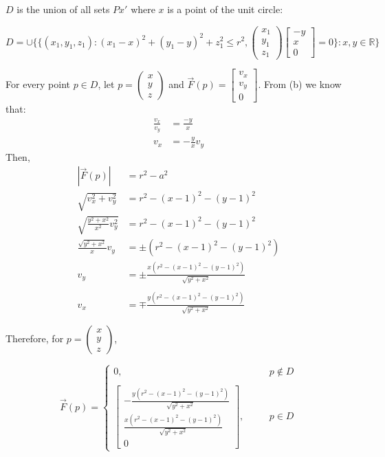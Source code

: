 \begin{exercise}{8}
\begin{enumerate}
    $D$ is the union of all sets $Px'$ where $x$ is a point of the unit circle:
    
    $$D = \cup\{\{(x_1, y_1, z_1): (x_1 - x)^2 + (y_1 - y)^2 + z_1^2 \leq r^2,
                                   \begin{pmatrix}x_1\\y_1\\z_1\end{pmatrix}
                                   \begin{bmatrix}-y\\x\\0\end{bmatrix} = 0
                \} : x, y \in \mathbb{R}\}$$
    
    For every point $p \in D$, let $p = \begin{pmatrix}x\\y\\z\end{pmatrix}$ and
    $\vec{F}(p) = \begin{bmatrix}v_x\\v_y\\0\end{bmatrix}$. From (b)
    we know that:
    \begin{align*}
      \frac{v_x}{v_y} &= \frac{-y}{x} \\
                  v_x &= -\frac{y}{x}v_y 
    \end{align*}
    Then,
    \begin{align*}
                         |\vec{F}(p)| &= r^2 - a^2 \\
                 \sqrt{v_x^2 + v_y^2} &= r^2 - (x-1)^2 - (y-1)^2 \\
      \sqrt{\frac{y^2+x^2}{x^2}v_y^2} &= r^2 - (x-1)^2 - (y-1)^2 \\
        \frac{\sqrt{y^2 + x^2}}{x}v_y &= \pm (r^2 - (x-1)^2 - (y-1)^2) \\
      v_y &= \pm \frac{x(r^2 - (x-1)^2 - (y-1)^2)}{\sqrt{y^2 + x^2}} \\ & \\
      v_x &= \mp \frac{y(r^2 - (x-1)^2 - (y-1)^2)}{\sqrt{y^2 + x^2}}
    \end{align*}
    
    Therefore, for $p = \begin{pmatrix}x\\y\\z\end{pmatrix}$,
    
    $$\vec{F}(p) =
      \left\{
      \begin{array}{lcr}
        0, & \quad & p \notin D \\ & & \\
        \begin{bmatrix}
          -\frac{y(r^2 - (x-1)^2 - (y-1)^2)}{\sqrt{y^2 + x^2}} \\
          \frac{x(r^2 - (x-1)^2 - (y-1)^2)}{\sqrt{y^2 + x^2}} \\
          0
        \end{bmatrix},
           & \quad & p \in D
      \end{array}
      \right.$$
      

\end{enumerate}
\end{exercise}

